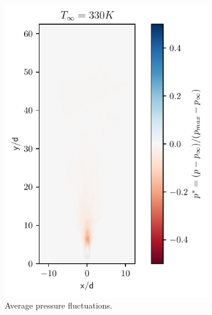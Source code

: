 \begin{figure}[htbp!]
\begin{subfigure}{0.25\textwidth}
	\includegraphics[scale=.65]{figures/Plots/vertical/330/pressure_scaled_vert_avg_330.pdf}
	\caption{Average pressure fluctuations.} \label{330_pressure_3}
\end{subfigure}
\hfill
\begin{subfigure}{0.25\textwidth}
	\centering

\end{subfigure}
\end{figure}
